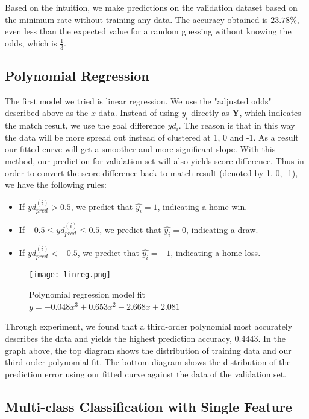 \documentclass{article}
\begin{document}
Based on the intuition, we make predictions on the validation dataset based on the minimum rate without training any data. The accuracy obtained is $23.78 \%$, even less than the expected value for a random guessing without knowing the odds, which is $\frac{1}{3}$.

\subsection{Polynomial Regression}
\label{poly_reg}
The first model we tried is linear regression. We use the "adjusted odds" described above as the $x$ data. Instead of using $y_i$ directly as $\mathbf{Y}$, which indicates the match result, we use the goal difference $yd_i$. The reason is that in this way the data will be more spread out instead of clustered at 1, 0 and -1. As a result our fitted curve will get a smoother and more significant slope. With this method, our prediction for validation set will also yields score difference. Thus in order to convert the score difference back to match result (denoted by 1, 0, -1), we have the following rules:
\begin{itemize}
	\item If $yd_{pred}^{(i)} > 0.5$, we predict that $\hat{y_i} = 1$, indicating a home win.
	\item If $-0.5 \leq yd_{pred}^{(i)} \leq 0.5$, we predict that $\hat{y_i} = 0$, indicating a draw.
	\item If $yd_{pred}^{(i)} < -0.5$, we predict that $\hat{y_i} = -1$, indicating a home loss.
\end{itemize}

\begin{figure}[!ht]
	\centering
	\texttt{[image: linreg.png]}
	\caption{Polynomial regression model fit $y = -0.048x^3 + 0.653x^2 -2.668x + 2.081$ }
	\label{fig_polyreg}
\end{figure}

Through experiment, we found that a third-order polynomial most accurately describes the data and yields the highest prediction accuracy, 0.4443. In the graph above, the top diagram shows the distribution of training data and our third-order polynomial fit. The bottom diagram shows the distribution of the prediction error using our fitted curve against the data of the validation set.



\subsection{Multi-class Classification with Single Feature}
\end{document}

